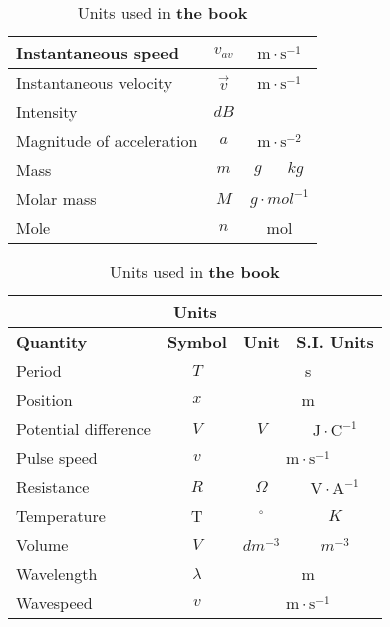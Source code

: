 \begin{table}[H]
\begin{center}
\begin{tabular}{|l|c|c|c|}
Instantaneous speed        & ${v}_{av}$      & \multicolumn{2}{c|}{$\text{m} \cdot \text{s}^{-1}$}  \\ \hline
Instantaneous velocity     & $\vec{v}$       & \multicolumn{2}{c|}{$\text{m} \cdot \text{s}^{-1}$}  \\ \hline
Intensity                  & $dB$            &                         &                            \\ \hline
Magnitude of acceleration  & $a$             & \multicolumn{2}{c|}{$\text{m} \cdot \text{s}^{-2}$}  \\ \hline
Mass                       & $m$             & $g$                     & $kg$                       \\ \hline
Molar mass                 & $M$             & \multicolumn{2}{c|}{$g \cdot mol^{-1}$}              \\ \hline
Mole                       & $n$             & \multicolumn{2}{c|}{mol}                             \\ \hline
\end{tabular}
\end{center}
\caption{Units used in \textbf{the book} }
\label{table:book::units1}
\end{table}
\begin{table}[H]
\begin{center}
\begin{tabular}{|l|c|c|c|}\hline \hline 
\multicolumn{4}{|c|}{\textbf{Units}}\\ \hline \hline
\textbf{Quantity}          & \textbf{Symbol} & \textbf{Unit}           & \textbf{S.I. Units}        \\ \hline
Period                     & $T$             & \multicolumn{2}{c|}{s}                               \\ \hline
Position                   & $x$             & \multicolumn{2}{c|}{m}                               \\ \hline 
Potential difference       & $V$             & $V$                     & $\text{J}\cdot \text{C}^{-1}$ \\ \hline
Pulse speed                & $v$             & \multicolumn{2}{c|}{$\text{m} \cdot \text{s}^{-1}$}  \\ \hline
Resistance                 & $R$             & $\Omega$                & $\text{V} \cdot \text{A}^{-1}$ \\ \hline 
Temperature                & T               & $^{\circ}$              & $K$                        \\ \hline
Volume                     & $V$             & $dm^{-3}$               & $m^{-3}$                   \\ \hline
Wavelength                 & $\lambda$       & \multicolumn{2}{c|}{m}                               \\ \hline
Wavespeed                  & $v$             & \multicolumn{2}{c|}{$\text{m} \cdot \text{s}^{-1}$}  \\ \hline
\end{tabular}
\end{center}
\caption{Units used in \textbf{the book} }
\label{table:book::units2}
\end{table}
